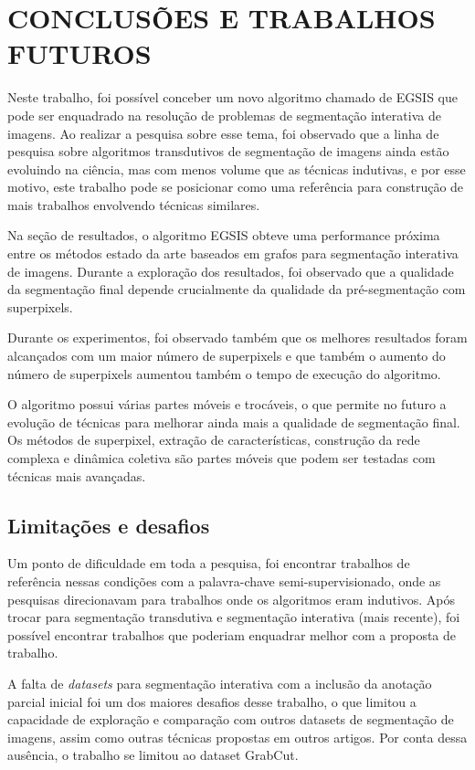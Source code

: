 \chapter{CONCLUSÕES E TRABALHOS FUTUROS}\label{chap:conclusoes-e-trabalhos-futuros}

Neste trabalho, foi possível conceber um novo algoritmo chamado de
\gls{EGSIS} que pode ser enquadrado na resolução de problemas de
segmentação interativa de imagens. Ao realizar a pesquisa sobre esse
tema, foi observado que a linha de pesquisa sobre algoritmos
transdutivos de segmentação de imagens ainda estão evoluindo na
ciência, mas com menos volume que as técnicas indutivas, e por esse
motivo, este trabalho pode se posicionar como uma referência para
construção de mais trabalhos envolvendo técnicas similares.

Na seção de resultados, o algoritmo \gls{EGSIS} obteve uma performance
próxima entre os métodos estado da arte baseados em grafos para
segmentação interativa de imagens. Durante a exploração dos
resultados, foi observado que a qualidade da segmentação final depende
crucialmente da qualidade da pré-segmentação com superpixels.

Durante os experimentos, foi observado também que os melhores
resultados foram alcançados com um maior número de superpixels e que
também o aumento do número de superpixels aumentou também o tempo de
execução do algoritmo.

O algoritmo possui várias partes móveis e trocáveis, o que permite no
futuro a evolução de técnicas para melhorar ainda mais a qualidade de
segmentação final. Os métodos de superpixel, extração de
características, construção da rede complexa e dinâmica coletiva são
partes móveis que podem ser testadas com técnicas mais avançadas.

\section{Limitações e desafios}\label{sec:limitacoes-desafios}

Um ponto de dificuldade em toda a pesquisa, foi encontrar trabalhos
de referência nessas condições com a palavra-chave
semi-supervisionado, onde as pesquisas direcionavam para trabalhos
onde os algoritmos eram indutivos. Após trocar para segmentação
transdutiva e segmentação interativa (mais recente), foi possível
encontrar trabalhos que poderiam enquadrar melhor com a proposta de
trabalho.

A falta de \textit{datasets} para segmentação interativa com a
inclusão da anotação parcial inicial foi um dos maiores desafios
desse trabalho, o que limitou a capacidade de exploração e comparação
com outros datasets de segmentação de imagens, assim como outras
técnicas propostas em outros artigos. Por conta dessa ausência, o
trabalho se limitou ao dataset GrabCut.

